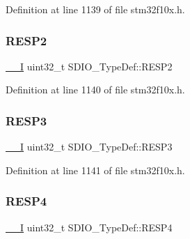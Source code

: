 Definition at line 1139 of file stm32f10x.\+h.

\mbox{\label{struct_s_d_i_o___type_def_a9228c8a38c07c508373644220dd322f0}} 
\subsubsection{\texorpdfstring{R\+E\+S\+P2}{RESP2}}
{\footnotesize\ttfamily \hyperlink{core__sc300_8h_af63697ed9952cc71e1225efe205f6cd3}{\+\_\+\+\_\+I} uint32\+\_\+t S\+D\+I\+O\+\_\+\+Type\+Def\+::\+R\+E\+S\+P2}



Definition at line 1140 of file stm32f10x.\+h.

\mbox{\label{struct_s_d_i_o___type_def_a70f3e911570bd326bff852664fd8a7d5}} 
\subsubsection{\texorpdfstring{R\+E\+S\+P3}{RESP3}}
{\footnotesize\ttfamily \hyperlink{core__sc300_8h_af63697ed9952cc71e1225efe205f6cd3}{\+\_\+\+\_\+I} uint32\+\_\+t S\+D\+I\+O\+\_\+\+Type\+Def\+::\+R\+E\+S\+P3}



Definition at line 1141 of file stm32f10x.\+h.

\mbox{\label{struct_s_d_i_o___type_def_ac7b45c7672922d38ffb0a1415a122716}} 
\subsubsection{\texorpdfstring{R\+E\+S\+P4}{RESP4}}
{\footnotesize\ttfamily \hyperlink{core__sc300_8h_af63697ed9952cc71e1225efe205f6cd3}{\+\_\+\+\_\+I} uint32\+\_\+t S\+D\+I\+O\+\_\+\+Type\+Def\+::\+R\+E\+S\+P4}



